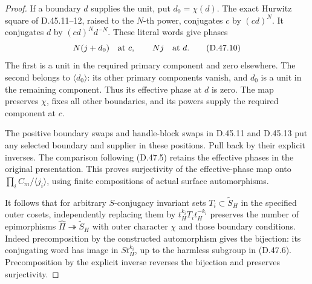 \begin{proof}
If a boundary \(d\) supplies the unit, put
\(d_0=\chi(d)\). The exact Hurwitz square of D.45.11--12,
raised to the \(N\)-th power, conjugates \(c\) by \((cd)^N\).
It conjugates \(d\) by \((cd)^Nd^{-N}\). These literal words
give phases
\[
                     N(j+d_0)\quad\hbox{at }c,
                         \qquad Nj\quad\hbox{at }d.
 \tag{D.47.10}
\]
The first is a unit in the required primary component and
zero elsewhere. The second belongs to \(\langle d_0\rangle\):
its other primary components vanish, and \(d_0\) is a unit
in the remaining component. Thus its effective phase at
\(d\) is zero. The map preserves \(\chi\), fixes all other
boundaries, and its powers supply the required component at
\(c\).

The positive boundary swaps and handle-block swaps in
D.45.11 and D.45.13 put any selected boundary and supplier
in these positions. Pull back by their explicit inverses.
The comparison following \textup{(D.47.5)} retains the
effective phases in the original presentation. This proves
surjectivity of the effective-phase map onto
\(\prod_i C_m/\langle j_i\rangle\), using finite
compositions of actual surface automorphisms.

It follows that for arbitrary \(S\)-conjugacy invariant
sets \(T_i\subset\widetilde S_H\) in the specified outer
cosets, independently replacing them by
\(t_H^{k_i}T_it_H^{-k_i}\) preserves the number of
epimorphisms \(\widehat\Pi\twoheadrightarrow\widetilde S_H\)
with outer character \(\chi\) and those boundary conditions.
Indeed precomposition by the constructed automorphism gives
the bijection: its conjugating word has image in
\(S t_H^{k_i}\), up to the harmless subgroup in
\textup{(D.47.6)}. Precomposition by the explicit inverse
reverses the bijection and preserves surjectivity.


\end{proof}
